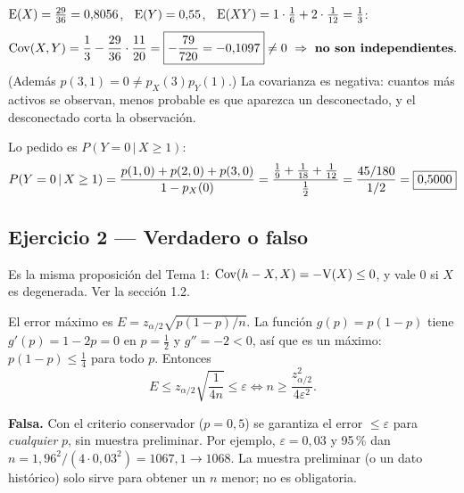 $\mathrm{E}(X)=\frac{29}{36}=0{,}8056$, \ $\mathrm{E}(Y)=0{,}55$, \ $\mathrm{E}(XY)=1\cdot\frac16+2\cdot\frac1{12}=\frac13$:
\[
\Cov(X,Y)=\frac13-\frac{29}{36}\cdot\frac{11}{20}=\res{-\frac{79}{720}=-0{,}1097}\neq0\ \Rightarrow\ \textbf{no son independientes}.
\]
(Además $p(3,1)=0\neq p_X(3)p_Y(1)$.) La covarianza es negativa: cuantos más activos se observan, menos probable es que aparezca un desconectado, y el desconectado corta la observación.

Lo pedido es $P(Y=0\,|\,X\ge1)$:
\[
P(Y=0\,|\,X\ge1)=\frac{p(1,0)+p(2,0)+p(3,0)}{1-p_X(0)}=\frac{\frac19+\frac1{18}+\frac1{12}}{\frac12}=\frac{45/180}{1/2}=\boxed{0{,}5000}
\]

\subsection{Ejercicio 2 --- Verdadero o falso}
Es la misma proposición del Tema 1: $\mathrm{Cov}(h-X,X)=-\mathrm{V}(X)\le0$, y vale 0 si $X$ es degenerada. Ver la sección 1.2.

 El error máximo es $E=z_{\alpha/2}\sqrt{p(1-p)/n}$. La función $g(p)=p(1-p)$ tiene $g'(p)=1-2p=0$ en $p=\frac12$ y $g''=-2<0$, así que es un máximo: $p(1-p)\le\frac14$ para todo $p$. Entonces
\[
E\le z_{\alpha/2}\sqrt{\frac{1}{4n}}\le\varepsilon\iff n\ge\frac{z_{\alpha/2}^2}{4\varepsilon^2}.
\]
\begin{resp}
\textbf{Falsa.} Con el criterio conservador ($p=0{,}5$) se garantiza el error $\le\varepsilon$ para \emph{cualquier} $p$, sin muestra preliminar. Por ejemplo, $\varepsilon=0{,}03$ y 95\,\% dan $n=1{,}96^2/(4\cdot0{,}03^2)=1067{,}1\to1068$.
La muestra preliminar (o un dato histórico) solo sirve para obtener un $n$ menor; no es obligatoria.
\end{resp}

